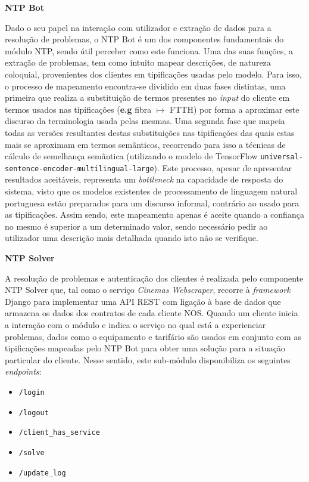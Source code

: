 \documentclass[11pt,a4paper]{article}
\begin{document}
\textbf{NTP Bot}

Dado o seu papel na interação com utilizador e extração de dados para a resolução de problemas, o NTP Bot é
um dos componentes fundamentais do módulo NTP, sendo útil perceber como este funciona. Uma das suas funções,
a extração de problemas, tem como intuito mapear descrições, de natureza coloquial, provenientes dos
clientes em tipificações usadas pelo modelo. Para isso, o processo de mapeamento encontra-se dividido em
duas fases distintas, uma primeira que realiza a substituição de termos presentes no \textit{input} do
cliente em termos usados nas tipificações (\textbf{e.g} fibra $\mapsto$ FTTH) por forma a aproximar este
discurso da terminologia usada pelas mesmas. Uma segunda fase que mapeia todas as versões resultantes destas
substituições nas tipificações das quais estas mais se aproximam em termos semânticos, recorrendo para isso
a técnicas de cálculo de semelhança semântica (utilizando o modelo de TensorFlow
\texttt{universal-sentence-encoder-multilingual-large}). Este processo, apesar de apresentar resultados
aceitáveis, representa um \textit{bottleneck} na capacidade de resposta do sistema, visto que os modelos
existentes de processamento de linguagem natural portuguesa estão preparados para um discurso informal,
contrário ao usado para as tipificações. Assim sendo, este mapeamento apenas é aceite quando a confiança no
mesmo é superior a um determinado valor, sendo necessário pedir ao utilizador uma descrição mais detalhada
quando isto não se verifique.
\newline

\textbf{NTP Solver}

A resolução de problemas e autenticação dos clientes é realizada pelo componente NTP Solver que, tal como o
serviço \textit{Cinemas Webscraper}, recorre à \textit{framework} Django para implementar uma API REST com ligação à
base de dados que armazena os dados dos contratos de cada cliente NOS. Quando um cliente inicia a interação
com o módulo e indica o serviço no qual está a experienciar problemas, dados como o equipamento e tarifário
são usados em conjunto com as tipificações mapeadas pelo NTP Bot para obter uma solução para a situação
particular do cliente. Nesse sentido, este sub-módulo disponibiliza os seguintes \textit{endpoints}:
\begin{itemize}
    \item \texttt{/login}
    \item \texttt{/logout}
    \item \texttt{/client\_has\_service}           
    \item \texttt{/solve}
    \item \texttt{/update\_log}
\end{itemize}
\end{document}
